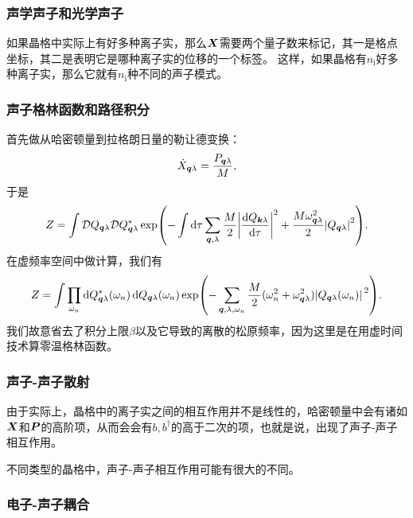 \documentclass[hyperref, UTF8, a4paper]{ctexart}
\begin{document}
\subsubsection{声学声子和光学声子}

如果晶格中实际上有好多种离子实，那么$\vb*{X}$需要两个量子数来标记，其一是格点坐标，其二是表明它是哪种离子实的位移的一个标签。
这样，如果晶格有$n_\text{i}$好多种离子实，那么它就有$n_\text{i}$种不同的声子模式。

\subsubsection{声子格林函数和路径积分}

首先做从哈密顿量到拉格朗日量的勒让德变换：
\[
    \dot{X}_{\vb*{q} \lambda} = \frac{P_{\vb*{q} \lambda}}{M},
\]
于是
\begin{equation}
    Z = \int \mathcal{D} Q_{\vb*{q} \lambda} \mathcal{D} Q^*_{\vb*{q} \lambda} \exp(- \int \dd{\tau} \sum_{\vb*{q}, \lambda} \frac{M}{2} \abs{\dv{Q_{\vb*{k} \lambda}}{\tau}}^2 + \frac{M \omega_{\vb*{q} \lambda}^2}{2} \abs{Q_{\vb*{q} \lambda}}^2 ).
\end{equation}
在虚频率空间中做计算，我们有
\begin{equation}
    Z = \int \prod_{\omega_n} \dd{Q_{\vb*{q} \lambda}^*(\omega_n)} \dd{Q_{\vb*{q} \lambda}(\omega_n)} \exp(- \sum_{\vb*{q}, \lambda, \omega_n} \frac{M}{2} (\omega_n^2 + \omega_{\vb*{q} \lambda}^2) \abs*{Q_{\vb*{q} \lambda}(\omega_n)}^2).
\end{equation}
我们故意省去了积分上限$\beta$以及它导致的离散的松原频率，因为这里是在用虚时间技术算零温格林函数。

\subsubsection{声子-声子散射}

由于实际上，晶格中的离子实之间的相互作用并不是线性的，哈密顿量中会有诸如$\vb*{X}$和$\vb*{P}$的高阶项，从而会会有${b}, {b}^\dagger$的高于二次的项，也就是说，出现了声子-声子相互作用。

不同类型的晶格中，声子-声子相互作用可能有很大的不同。

\subsubsection{电子-声子耦合}
\end{document}
